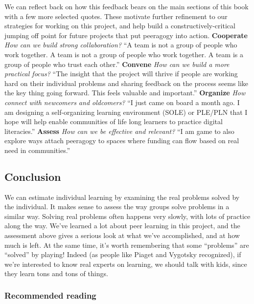We can reflect back on how this feedback bears on the main sections of
this book with a few more selected quotes. These motivate further
refinement to our strategies for working on this project, and help build
a constructively-critical jumping off point for future projects that put
peeragogy into action. \textbf{Cooperate} \emph{How can we build strong
collaboration?} ``A team is not a group of people who work together. A
team is not a group of people who work together. A team is a group of
people who trust each other.'' \textbf{Convene} \emph{How can we build a
more practical focus?} ``The insight that the project will thrive if
people are working hard on their individual problems and sharing
feedback on the process seems like the key thing going forward. This
feels valuable and important.'' \textbf{Organize} \emph{How connect with
newcomers and oldcomers?} ``I just came on board a month ago. I am
designing a self-organizing learning environment (SOLE) or PLE/PLN that
I hope will help enable communities of life long learners to practice
digital literacies.'' \textbf{Assess} \emph{How can we be effective and
relevant?} ``I am game to also explore ways attach peeragogy to spaces
where funding can flow based on real need in communities.''

\subsection{Conclusion}

We can estimate individual learning by examining the real problems
solved by the individual. It makes sense to assess the way groups solve
problems in a similar way. Solving real problems often happens very
slowly, with lots of practice along the way. We've learned a lot about
peer learning in this project, and the assessment above gives a serious
look at what we've accomplished, and at how much is left. At the same
time, it's worth remembering that some ``problems'' are ``solved'' by
playing! Indeed (as people like Piaget and Vygotsky recognized), if
we're interested to know real experts on learning, we should talk with
kids, since they learn tons and tons of things.

\subsubsection{Recommended reading}

